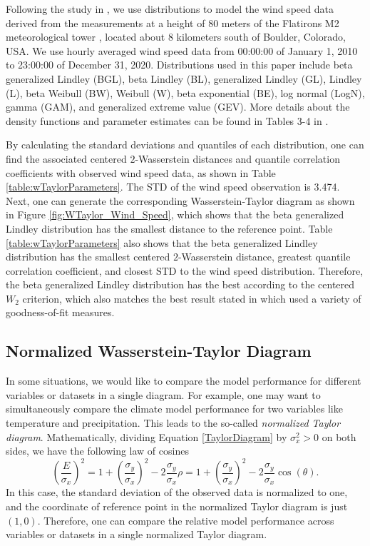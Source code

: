 \documentclass{amsart}
\numberwithin{equation}{section}
\theoremstyle{plain}
\theoremstyle{definition}
\begin{document}
Following the study in \cite{yang2025beta}, we use distributions to model the wind speed data derived from the measurements at a height of 80 meters of the Flatirons M2 meteorological tower \cite{jager1996nrel}, located about 8 kilometers south of Boulder, Colorado, USA. We use hourly averaged wind speed data from 00:00:00 of January 1, 2010 to 23:00:00 of December 31, 2020. 
Distributions used in this paper include beta generalized Lindley (BGL), beta Lindley (BL), generalized Lindley (GL), Lindley (L), beta Weibull (BW), Weibull (W), beta exponential (BE), log normal (LogN), gamma (GAM), and generalized extreme value (GEV). 
More details about the density functions and parameter estimates can be found in Tables 3-4 in \cite{yang2025beta}. 



By calculating the standard deviations and quantiles of each distribution, one can find the associated centered $2$-Wasserstein distances and quantile correlation coefficients with observed wind speed data, as shown in Table \ref{table:wTaylorParameters}. 
The STD of the wind speed observation is 3.474. 
Next, one can generate the corresponding Wasserstein-Taylor diagram as shown in Figure \ref{fig:WTaylor_Wind_Speed}, which shows that the beta generalized Lindley distribution has the smallest distance to the reference point. 
Table \ref{table:wTaylorParameters} also shows that the beta generalized Lindley distribution has the smallest centered $2$-Wasserstein distance, greatest quantile correlation coefficient, and closest STD to the wind speed distribution. 
Therefore, the beta generalized Lindley distribution has the best according to the centered $W_2$ criterion, which also matches the best result stated in \cite{yang2025beta} which used a variety of goodness-of-fit measures.





\subsection{Normalized Wasserstein-Taylor Diagram}\label{sec:normalized}
In some situations, we would like to compare the model performance for different variables or datasets in a single diagram. 
For example, one may want to simultaneously compare the climate model performance for two variables like temperature and precipitation. 
This leads to the so-called \emph{normalized Taylor diagram}. 
Mathematically, dividing Equation \eqref{TaylorDiagram} by $\sigma_x^2>0$ on both sides, we have the following law of cosines
\begin{equation}
\left(\frac{E}{\sigma_x}\right)^2 = 1 + \left(\frac{\sigma_y}{\sigma_x}\right)^2 - 2 \frac{\sigma_y}{\sigma_x} \rho 
 = 1 + \left(\frac{\sigma_y}{\sigma_x}\right)^2 - 2\frac{\sigma_y}{\sigma_x}\cos(\theta). 
\end{equation}
In this case, the standard deviation of the observed data is normalized to one, and the coordinate of reference point in the normalized Taylor diagram is just $(1,0)$. 
Therefore, one can compare the relative model performance across variables or datasets in a single normalized Taylor diagram. 
\end{document}
